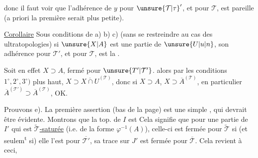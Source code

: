 donc il faut voir que l'adhérence de $y$ pour ${\unsure{\mathcal{T}|\tau}}'$, et pour $\mathcal{T}$, est pareille (a priori la première serait plus petite).  

\uline{Corollaire} Sous   conditions de a) b) c) (sans se restreindre au cas des ultratopologies) si $\unsure{X|A}$ est une partie de $\unsure{U|u|n}$, son adhérence pour $\mathcal{T}'$, et pour $\mathcal{T}$, est la \unsure{$=$}. 

Soit en effet $X\supset A$, fermé pour $\unsure{T'|\mathcal{T}'}$. alors par les conditions $1^\circ,2^\circ,3^\circ)$ plus haut, $X\supset\overline{X\cap U}^{(\mathcal{T})}$, donc si $X\supset A$, $X\supset\overline{A}^{(\mathcal{T})}$,  en particulier $\overline{A}^{(\mathcal{T}')}\supset\overline{A}^{(\mathcal{T})}$, OK.

Prouvons e). La première assertion (bas de la page) est une simple , qui devrait être évidente.  Montrons que la top. de $I$ est   Cela signifie que pour une partie de $I'$ qui est \uline{$\widetilde{\mathcal{T}}$-saturée} (i.e. de la forme $\varphi^{-1}(A)$), celle-ci est fermée pour $\widetilde{\mathcal{T}}$ si (et seulem\textsuperscript{t} si) elle l'est pour $\overline{\mathcal{T}'}$,  sa trace sur $J'$ est fermée pour $\overline{\mathcal{T}}$. Cela revient à ceci, 
